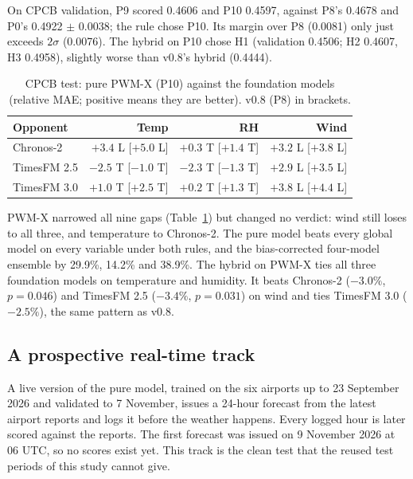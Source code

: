 On CPCB validation, P9 scored 0.4606 and P10 0.4597, against P8's 0.4678 and P0's 0.4922 $\pm$ 0.0038; the rule
chose P10. Its margin over P8 (0.0081) only just exceeds $2\sigma$ (0.0076). The hybrid on P10 chose H1 (validation
0.4506; H2 0.4607, H3 0.4958), slightly worse than v0.8's hybrid (0.4444).

\begin{table}[t]
\caption{CPCB test: pure PWM-X (P10) against the foundation models (relative MAE; positive means they are better).
v0.8 (P8) in brackets.}
\label{tab:pwmx}
\small
\setlength{\tabcolsep}{3pt}
\begin{tabular}{@{}lrrr@{}}
\toprule
Opponent & Temp & RH & Wind \\
\midrule
Chronos-2 & $+3.4$ L [$+5.0$ L] & $+0.3$ T [$+1.4$ T] & $+3.2$ L [$+3.8$ L] \\
TimesFM 2.5 & $-2.5$ T [$-1.0$ T] & $-2.3$ T [$-1.3$ T] & $+2.9$ L [$+3.5$ L] \\
TimesFM 3.0 & $+1.0$ T [$+2.5$ T] & $+0.2$ T [$+1.3$ T] & $+3.8$ L [$+4.4$ L] \\
\bottomrule
\end{tabular}
\end{table}

PWM-X narrowed all nine gaps (Table~\ref{tab:pwmx}) but changed no verdict: wind still loses to all three, and
temperature to Chronos-2. The pure model beats every global model on every variable under both rules, and the
bias-corrected four-model ensemble by 29.9\%, 14.2\% and 38.9\%. The hybrid on PWM-X ties all three foundation models
on temperature and humidity. It beats Chronos-2 ($-3.0\%$, $p=0.046$) and TimesFM 2.5 ($-3.4\%$, $p=0.031$) on wind
and ties TimesFM 3.0 ($-2.5\%$), the same pattern as v0.8.

\subsection{A prospective real-time track}

A live version of the pure model, trained on the six airports up to 23 September 2026 and validated to 7 November,
issues a 24-hour forecast from the latest airport reports and logs it before the weather happens. Every logged
hour is later scored against the reports. The first forecast was issued on 9 November 2026 at 06 UTC, so no scores
exist yet. This track is the clean test that the reused test periods of this study cannot give.
